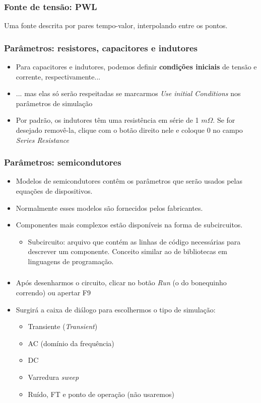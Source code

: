 \documentclass{beamer}
\begin{document}
\begin{frame}
\frametitle{Fonte de tensão: PWL}
Uma fonte descrita por pares tempo-valor, interpolando entre os pontos.
\end{frame}

\begin{frame}
\frametitle{Parâmetros: resistores, capacitores e indutores}
\begin{itemize}
\item{Para capacitores e indutores, podemos definir \textbf{condições iniciais} de tensão e corrente, respectivamente...}
\item{... mas elas só serão respeitadas se marcarmos \textit{Use initial Conditions} nos parâmetros de simulação}
\item{Por padrão, os indutores têm uma resistência em série de 1 $m\Omega$. Se for desejado removê-la, clique com o botão direito nele e coloque 0 no campo \textit{Series Resistance}}
\end{itemize}
\end{frame}

\begin{frame}
\frametitle{Parâmetros: semicondutores}
\begin{itemize}
\item{Modelos de semicondutores contêm os parâmetros que serão usados pelas equações de dispositivos.}
\item{Normalmente esses modelos são fornecidos pelos fabricantes.}
\item{Componentes mais complexos estão disponíveis na forma de subcircuitos.}
\begin{itemize}
\item{Subcircuito}: arquivo que contém as linhas de código necessárias para descrever um componente. Conceito similar ao de bibliotecas em linguagens de programação.
\end{itemize}
\end{itemize}
\end{frame}

\begin{frame}
\frametitle{}
\begin{itemize}
\item{Após desenharmos o circuito, clicar no botão \textit{Run} (o do bonequinho correndo) ou apertar F9}
\item{Surgirá a caixa de diálogo para escolhermos o tipo de simulação:}
\begin{itemize}
\item{Transiente (\textit{Transient})}
\item{AC (domínio da frequência)}
\item{DC}
\item{Varredura \textit{sweep}}
\item{Ruído, FT e ponto de operação (não usaremos)}
\end{itemize}
\end{itemize}
\end{frame}
\end{document}
